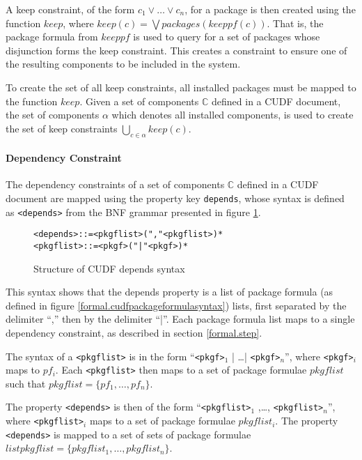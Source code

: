A keep constraint, of the form $c_1 \vee \ldots \vee c_n$, for a package is then created using the function $keep$,
where $keep(c) = \bigvee packages(keeppf(c))$.
That is, the package formula from $keeppf$ is used to query for a set of packages whose disjunction forms the keep constraint.
This creates a constraint to ensure one of the resulting components to be included in the system.

To create the set of all keep constraints, all installed packages must be mapped to the function $keep$.
Given a set of components $\mathbb{C}$ defined in a CUDF document, 
the set of components $\alpha$ which denotes all installed components, is used to create the set of keep constraints $\bigcup \limits_{c \in \alpha} keep(c)$.

\paragraph{Dependency Constraint}
The dependency constraints of a set of components $\mathbb{C}$ defined in a CUDF document are mapped using the property key \verb+depends+,
whose syntax is defined as \verb+<depends>+ from the BNF grammar presented in figure \ref{formal.cudfdependssyntax}.

\begin{figure}[htp] 
\begin{center}
\begin{alltt}
<depends> ::= <pkgflist> ("," <pkgflist>)*
<pkgflist> ::= <pkgf> ("|" <pkgf>)*
\end{alltt}
  \caption[CUDF Package depends syntax]{Structure of CUDF depends syntax}
  \label{formal.cudfdependssyntax}
\end{center}
\end{figure}

This syntax shows that the depends property is a list of package formula (as defined in figure \ref{formal.cudfpackageformulasyntax}) lists, 
first separated by the delimiter ``,'' then by the delimiter ``|''.
Each package formula list maps to a single dependency constraint, as described in section \ref{formal.step}.

The syntax of a \verb+<pkgflist>+ is in the form ``\verb+<pkgf>+$_1$ | \ldots | \verb+<pkgf>+$_n$'', where \verb+<pkgf>+$_i$ maps to $pf_i$.
Each \verb+<pkgflist>+ then maps to a set of package formulae $pkgflist$ such that $pkgflist = \{pf_1,\ldots, pf_n\}$.

The property \verb+<depends>+ is then of the form ``\verb+<pkgflist>+$_1$ ,\ldots, \verb+<pkgflist>+$_n$'', where \verb+<pkgflist>+$_i$ maps to a set of package formulae $pkgflist_i$. 
The property \verb+<depends>+ is mapped to a set of sets of package formulae $listpkgflist = \{pkgflist_1,\ldots,pkgflist_n\}$.

